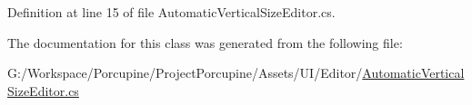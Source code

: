Definition at line 15 of file Automatic\+Vertical\+Size\+Editor.\+cs.



The documentation for this class was generated from the following file\+:\begin{DoxyCompactItemize}
\item 
G\+:/\+Workspace/\+Porcupine/\+Project\+Porcupine/\+Assets/\+U\+I/\+Editor/\hyperlink{_automatic_vertical_size_editor_8cs}{Automatic\+Vertical\+Size\+Editor.\+cs}\end{DoxyCompactItemize}
